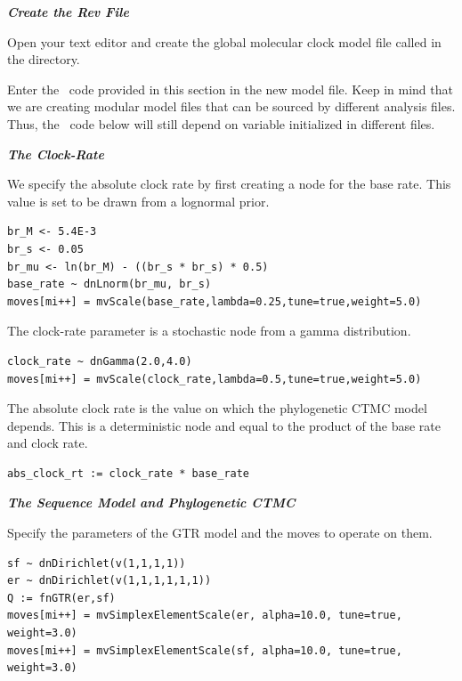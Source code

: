 \textbf{\textit{Create the Rev File}}

{\begin{framed}
Open your text editor and create the global molecular clock model file called {\textcolor{red}{}} in the  directory.

Enter the \Rev~code provided in this section in the new model file. Keep in mind that we are creating modular model files that can be sourced by different analysis files. Thus, the \Rev~code below will still depend on variable initialized in different files.
\end{framed}}




\textbf{\textit{The Clock-Rate}}

We specify the absolute clock rate by first creating a node for the base rate.
This value is set to be drawn from a lognormal prior.
{\tt \begin{snugshade*}
\begin{lstlisting}
br_M <- 5.4E-3
br_s <- 0.05
br_mu <- ln(br_M) - ((br_s * br_s) * 0.5)
base_rate ~ dnLnorm(br_mu, br_s)
moves[mi++] = mvScale(base_rate,lambda=0.25,tune=true,weight=5.0)
\end{lstlisting}
\end{snugshade*}}

The clock-rate parameter is a stochastic node from a gamma distribution.
{\tt \begin{snugshade*}
\begin{lstlisting}
clock_rate ~ dnGamma(2.0,4.0)
moves[mi++] = mvScale(clock_rate,lambda=0.5,tune=true,weight=5.0)
\end{lstlisting}
\end{snugshade*}}

The absolute clock rate is the value on which the phylogenetic CTMC model depends. This is a deterministic node and equal to the product of the base rate and clock rate.
{\tt \begin{snugshade*}
\begin{lstlisting}
abs_clock_rt := clock_rate * base_rate
\end{lstlisting}
\end{snugshade*}}

\textbf{\textit{The Sequence Model and Phylogenetic CTMC}}

Specify the parameters of the GTR model and the moves to operate on them.
{\tt \begin{snugshade*}
\begin{lstlisting}
sf ~ dnDirichlet(v(1,1,1,1))
er ~ dnDirichlet(v(1,1,1,1,1,1))
Q := fnGTR(er,sf)
moves[mi++] = mvSimplexElementScale(er, alpha=10.0, tune=true, weight=3.0)
moves[mi++] = mvSimplexElementScale(sf, alpha=10.0, tune=true, weight=3.0)
\end{lstlisting}
\end{snugshade*}}

